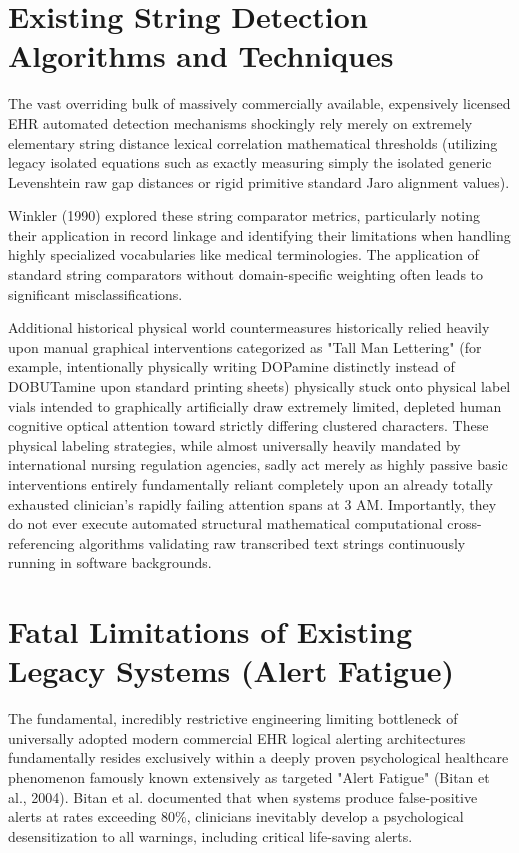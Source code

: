 \documentclass[12pt,a4paper]{report}
\begin{document}
\section{Existing String Detection Algorithms and Techniques}
The vast overriding bulk of massively commercially available, expensively licensed EHR automated detection mechanisms shockingly rely merely on extremely elementary string distance lexical correlation mathematical thresholds (utilizing legacy isolated equations such as exactly measuring simply the isolated generic Levenshtein raw gap distances or rigid primitive standard Jaro alignment values).

Winkler (1990) explored these string comparator metrics, particularly noting their application in record linkage and identifying their limitations when handling highly specialized vocabularies like medical terminologies. The application of standard string comparators without domain-specific weighting often leads to significant misclassifications.

Additional historical physical world countermeasures historically relied heavily upon manual graphical interventions categorized as "Tall Man Lettering" (for example, intentionally physically writing DOPamine distinctly instead of DOBUTamine upon standard printing sheets) physically stuck onto physical label vials intended to graphically artificially draw extremely limited, depleted human cognitive optical attention toward strictly differing clustered characters. These physical labeling strategies, while almost universally heavily mandated by international nursing regulation agencies, sadly act merely as highly passive basic interventions entirely fundamentally reliant completely upon an already totally exhausted clinician's rapidly failing attention spans at 3 AM. Importantly, they do not ever execute automated structural mathematical computational cross-referencing algorithms validating raw transcribed text strings continuously running in software backgrounds.

\section{Fatal Limitations of Existing Legacy Systems (Alert Fatigue)}
The fundamental, incredibly restrictive engineering limiting bottleneck of universally adopted modern commercial EHR logical alerting architectures fundamentally resides exclusively within a deeply proven psychological healthcare phenomenon famously known extensively as targeted "Alert Fatigue" (Bitan et al., 2004). Bitan et al. documented that when systems produce false-positive alerts at rates exceeding 80\%, clinicians inevitably develop a psychological desensitization to all warnings, including critical life-saving alerts.
\end{document}
